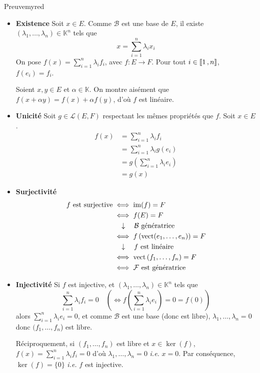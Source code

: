     \begin{demo}{Preuve}{myred}
        \begin{itemize}
            \item \textbf{Existence} \quad Soit $x \in E$. Comme $\mathcal{B}$ est une base de $E$, il existe $(\lambda_1, \ldots, \lambda_n) \in \mathbb{K}^n$ tels que 
            \[ x = \sum_{i=1}^{n} \lambda_i x_i \]
            On pose $f(x) = \sum_{i=1}^{n} \lambda_i f_i$, avec $f : E \to F$. Pour tout $i \in \left\llbracket 1 \, , n \right\rrbracket$, $f(e_i) = f_i$.

            Soient $x,y \in E$ et $\alpha \in \mathbb{K}$. On montre aisément que $f(x  + \alpha y) = f(x) + \alpha f(y)$, d’où $f$ est linéaire.
            \item \textbf{Unicité} \quad Soit $g \in \mathcal{L}(E,F)$ respectant les mêmes propriétés que $f$. Soit $x \in E$.
            \begin{align*}
                f(x)
                &= \sum_{i=1}^{n} \lambda_i f_i \\
                &= \sum_{i=1}^{n} \lambda_i g(e_i) \\
                &= g\left(\sum_{i=1}^{n} \lambda_i e_i\right) \\
                &= g(x)
            \end{align*}
            \item \textbf{Surjectivité} \quad 
            \begin{align*}
                f \text{ est surjective}
                &\iff \operatorname{im}(f) = F \\
                &\iff f(E) = F \\
                &\quad \downarrow \quad \mathcal{B} \text{ génératrice} \\
                &\iff f\left(\operatorname{vect}(e_1,\ldots,e_n)\right) = F \\
                &\quad \downarrow \quad f \text{ est linéaire} \\
                &\iff \operatorname{vect}\left(f_1,\ldots,f_n\right) = F \\
                &\iff \mathcal{F} \text{ est génératrice}
            \end{align*}
            \item \textbf{Injectivité} \quad Si $f$ est injective, et $(\lambda_1, \ldots, \lambda_n) \in \mathbb{K}^n$ tels que 
            \[ \sum_{i=1}^{n} \lambda_i f_i = 0 \quad \left(\iff f\left( \sum_{i=1}^{n} \lambda_i e_i \right) = 0 = f(0)\right) \]
            alors $\sum_{i=1}^{n} \lambda_i e_i = 0$, et comme $\mathcal{B}$ est une base (donc est libre), $\lambda_1,\ldots,\lambda_n = 0$ donc $(f_1,\ldots,f_n$) est libre. 

            Réciproquement, si $(f_1,\ldots,f_n)$ est libre et $x \in \ker(f)$, $f(x) = \sum_{i=1}^{n} \lambda_i f_i= 0$ d’où $\lambda_1,\ldots,\lambda_n = 0$ \textit{i.e.} $x = 0$. Par conséquence, $\ker(f) = \{0\}$ \textit{i.e.} $f$ est injective.
        \end{itemize}
    \end{demo}

